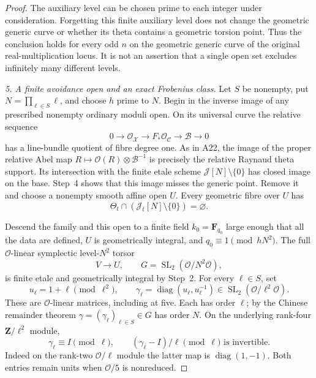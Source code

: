 \begin{proof}
The auxiliary level can be chosen prime to each integer under
consideration.  Forgetting this finite auxiliary level does not
change the geometric generic curve or whether its theta contains
a geometric torsion point.  Thus the conclusion holds for every
odd $n$ on the geometric generic curve of the original
real-multiplication locus.  It is not an assertion that a
single open set excludes infinitely many different levels.

\emph{5. A finite avoidance open and an exact Frobenius class.}
Let $S$ be nonempty, put $N=\prod_{\ell\in S}\ell$, and choose
$h$ prime to $N$.  Begin in the inverse image of any prescribed
nonempty ordinary moduli open.  On its universal curve the
relative sequence
\[
 0\longrightarrow\mathcal O_{\mathcal X}
 \longrightarrow F_*\mathcal O_{\mathcal C}
 \longrightarrow\mathcal B\longrightarrow0                 \tag{RM.8}
\]
has a line-bundle quotient of fibre degree one.  As in A22,
the image of the proper relative Abel map
$R\mapsto\mathcal O(R)\otimes\mathcal B^{-1}$ is precisely
the relative Raynaud theta support.  Its intersection with
the finite etale scheme $\mathcal J[N]\setminus\{0\}$ has
closed image on the base.  Step~4 shows that this image
misses the generic point.  Remove it and choose a nonempty
smooth affine open $U$.  Every geometric fibre over $U$ has
\[
                         \Theta_t\cap
                    (\mathcal J_t[N]\setminus\{0\})
                              =\varnothing.                  \tag{RM.9}
\]

Descend the family and this open to a finite field
$k_0=\mathbf F_{q_0}$ large enough that all the data are
defined, $U$ is geometrically integral, and
$q_0\equiv1\pmod{hN^2}$.  The full
$\mathcal O$-linear symplectic level-$N^2$ torsor
\[
                      V\longrightarrow U,
 \qquad G=\operatorname{SL}_2(\mathcal O/N^2\mathcal O),         \tag{RM.10}
\]
is finite etale and geometrically integral by Step~2.
For every $\ell\in S$, set
\[
 u_\ell=1+\ell\pmod{\ell^2},\qquad
 \gamma_\ell=
   \operatorname{diag}(u_\ell,u_\ell^{-1})
       \in\operatorname{SL}_2(\mathcal O/\ell^2\mathcal O).
                                                               \tag{RM.11}
\]
These are $\mathcal O$-linear matrices, including at five.
Each has order $\ell$; by the Chinese remainder theorem
$\gamma=(\gamma_\ell)_{\ell\in S}\in G$ has order $N$.
On the underlying rank-four $\mathbf Z/\ell^2$ module,
\[
 \gamma_\ell\equiv I\pmod\ell,
 \qquad (\gamma_\ell-I)/\ell\pmod\ell
             \text{ is invertible}.                          \tag{RM.12}
\]
Indeed on the rank-two $\mathcal O/\ell$ module the latter
map is $\operatorname{diag}(1,-1)$.  Both entries remain
units when $\mathcal O/5$ is nonreduced.


\end{proof}

